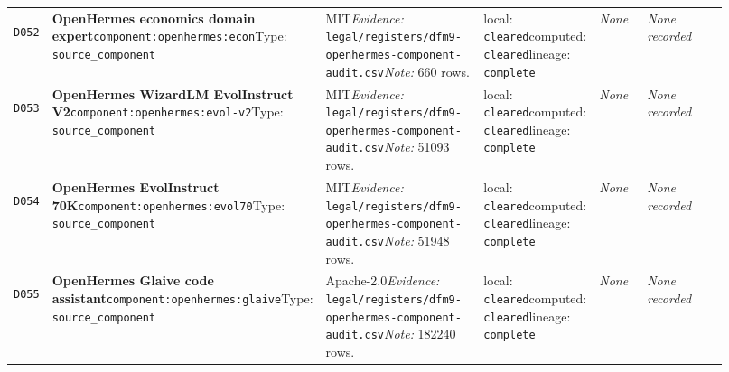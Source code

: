 \documentclass[9pt,a4paper]{article}
\newcommand{\depid}[1]{\hypertarget{dep:#1}{\texttt{#1}}}
\begin{document}
\begin{landscape}
\begin{longtable}{@{}L{0.035\linewidth}L{0.185\linewidth}L{0.27\linewidth}L{0.09\linewidth}L{0.10\linewidth}L{0.24\linewidth}@{}}
\depid{D052} & \textbf{OpenHermes economics domain expert}\newline \nolinkurl{component:openhermes:econ}\newline Type: \texttt{source\_component} & MIT\newline \textit{Evidence:} \nolinkurl{legal/registers/dfm9-openhermes-component-audit.csv}\newline \textit{Note:} 660 rows. & local: \texttt{cleared}\newline computed: \texttt{cleared}\newline lineage: \texttt{complete} & \textit{None} & \textit{None recorded} \\
\depid{D053} & \textbf{OpenHermes WizardLM EvolInstruct V2}\newline \nolinkurl{component:openhermes:evol-v2}\newline Type: \texttt{source\_component} & MIT\newline \textit{Evidence:} \nolinkurl{legal/registers/dfm9-openhermes-component-audit.csv}\newline \textit{Note:} 51093 rows. & local: \texttt{cleared}\newline computed: \texttt{cleared}\newline lineage: \texttt{complete} & \textit{None} & \textit{None recorded} \\
\depid{D054} & \textbf{OpenHermes EvolInstruct 70K}\newline \nolinkurl{component:openhermes:evol70}\newline Type: \texttt{source\_component} & MIT\newline \textit{Evidence:} \nolinkurl{legal/registers/dfm9-openhermes-component-audit.csv}\newline \textit{Note:} 51948 rows. & local: \texttt{cleared}\newline computed: \texttt{cleared}\newline lineage: \texttt{complete} & \textit{None} & \textit{None recorded} \\
\depid{D055} & \textbf{OpenHermes Glaive code assistant}\newline \nolinkurl{component:openhermes:glaive}\newline Type: \texttt{source\_component} & Apache-2.0\newline \textit{Evidence:} \nolinkurl{legal/registers/dfm9-openhermes-component-audit.csv}\newline \textit{Note:} 182240 rows. & local: \texttt{cleared}\newline computed: \texttt{cleared}\newline lineage: \texttt{complete} & \textit{None} & \textit{None recorded} \\

\end{longtable}
\end{landscape}
\end{document}
